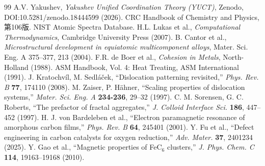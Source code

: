 \documentclass[11pt,a4paper]{article}
\theoremstyle{remark}
\begin{document}
	\begin{thebibliography}{99}
		 A.V. Yakushev, \emph{Yakushev Unified Coordination Theory (YUCT)}, Zenodo, DOI:10.5281/zenodo.18444599 (2026).
		 CRC Handbook of Chemistry and Physics, 第106版.
		 NIST Atomic Spectra Database.
		 H.L. Lukas et al., \emph{Computational Thermodynamics}, Cambridge University Press (2007).
		 B. Cantor et al., \emph{Microstructural development in equiatomic multicomponent alloys}, Mater. Sci. Eng. A 375–377, 213 (2004).
		 F.R. de Boer et al., \emph{Cohesion in Metals}, North-Holland (1988).
		 ASM Handbook, Vol. 4: Heat Treating, ASM International (1991).
		 J. Kratochv\'il, M. Sedl\'a\v{c}ek, ``Dislocation patterning revisited,'' \emph{Phys. Rev. B} \textbf{77}, 174110 (2008).
		 M. Zaiser, P. H\"ahner, ``Scaling properties of dislocation systems,'' \emph{Mater. Sci. Eng. A} \textbf{234-236}, 29–32 (1997).
		 C. M. Sorensen, G. C. Roberts, ``The prefactor of fractal aggregates,'' \emph{J. Colloid Interface Sci.} \textbf{186}, 447–452 (1997).
		 H. J. von Bardeleben et al., ``Electron paramagnetic resonance of amorphous carbon films,'' \emph{Phys. Rev. B} \textbf{64}, 245401 (2001).
		 Y. Fu et al., ``Defect engineering in carbon catalysts for oxygen reduction,'' \emph{Adv. Mater.} \textbf{37}, 2401234 (2025).
		 Y. Gao et al., ``Magnetic properties of FeC$_6$ clusters,'' \emph{J. Phys. Chem. C} \textbf{114}, 19163–19168 (2010).
	\end{thebibliography}
	
	
	
\end{document}
